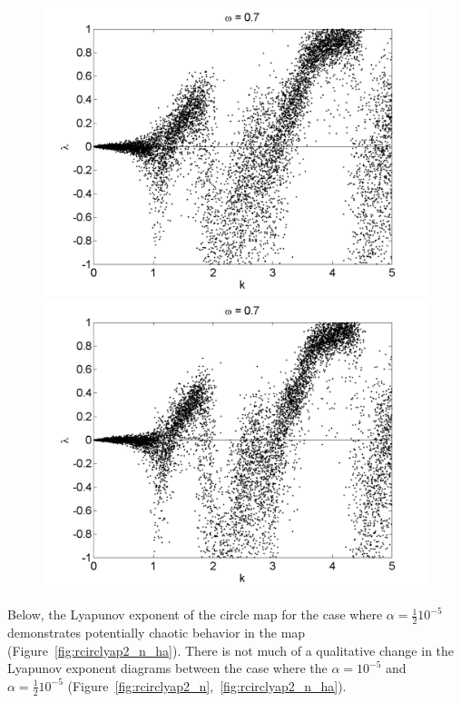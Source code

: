 \begin{figure}[!h]
\includegraphics[width=.5\textwidth]{figs/rcirc_n_lyap_L_05_k_10000.png}\hfill
\includegraphics[width=.5\textwidth]{figs/rcirc_n_lyap_L_07_k_10000.png}\\
\end{figure}

Below, the Lyapunov exponent of the circle map for the case where
$\alpha = \frac{1}{2}10^{-5}$ demonstrates potentially chaotic
behavior in the map (Figure~\ref{fig:rcirclyap2_n_ha}). There is not
much of a qualitative change in the Lyapunov exponent diagrams between the case where the $\alpha = 10^{-5}$ and $\alpha = \frac{1}{2}10^{-5}$ (Figure~\ref{fig:rcirclyap2_n},~\ref{fig:rcirclyap2_n_ha}).

